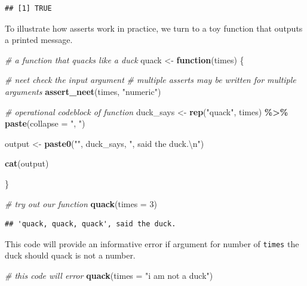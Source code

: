 \documentclass[
]{article}
\newenvironment{Shaded}{\begin{snugshade}}{\end{snugshade}}
\newcommand{\CharTok}[1]{\textcolor[rgb]{0.31,0.60,0.02}{#1}}
\newcommand{\CommentTok}[1]{\textcolor[rgb]{0.56,0.35,0.01}{\textit{#1}}}
\newcommand{\ControlFlowTok}[1]{\textcolor[rgb]{0.13,0.29,0.53}{\textbf{#1}}}
\newcommand{\DataTypeTok}[1]{\textcolor[rgb]{0.13,0.29,0.53}{#1}}
\newcommand{\DecValTok}[1]{\textcolor[rgb]{0.00,0.00,0.81}{#1}}
\newcommand{\KeywordTok}[1]{\textcolor[rgb]{0.13,0.29,0.53}{\textbf{#1}}}
\newcommand{\NormalTok}[1]{#1}
\newcommand{\OperatorTok}[1]{\textcolor[rgb]{0.81,0.36,0.00}{\textbf{#1}}}
\newcommand{\StringTok}[1]{\textcolor[rgb]{0.31,0.60,0.02}{#1}}
\begin{document}
\begin{verbatim}
## [1] TRUE
\end{verbatim}

To illustrate how asserts work in practice, we turn to a toy function that outputs a printed message.

\begin{Shaded}
\begin{Highlighting}[]
\CommentTok{\# a function that quacks like a duck}
\NormalTok{quack <{-}}\StringTok{ }\ControlFlowTok{function}\NormalTok{(times) \{}
  
  \CommentTok{\# neet check the input argument}
  \CommentTok{\# multiple asserts may be written for multiple arguments}
  \KeywordTok{assert\_neet}\NormalTok{(times, }\StringTok{"numeric"}\NormalTok{)}
  
  \CommentTok{\# operational codeblock of function}
\NormalTok{  duck\_says <{-}}\StringTok{ }\KeywordTok{rep}\NormalTok{(}\StringTok{"quack"}\NormalTok{, times) }\OperatorTok{\%>\%}\StringTok{ }
\StringTok{    }\KeywordTok{paste}\NormalTok{(}\DataTypeTok{collapse =} \StringTok{", "}\NormalTok{)}
  
\NormalTok{  output <{-}}\StringTok{ }\KeywordTok{paste0}\NormalTok{(}\StringTok{"\textquotesingle{}"}\NormalTok{, duck\_says, }\StringTok{"\textquotesingle{}, said the duck.}\CharTok{\textbackslash{}n}\StringTok{"}\NormalTok{)}
  
  \KeywordTok{cat}\NormalTok{(output)}
  
\NormalTok{\}}

\CommentTok{\# try out our function}
\KeywordTok{quack}\NormalTok{(}\DataTypeTok{times =} \DecValTok{3}\NormalTok{)}
\end{Highlighting}
\end{Shaded}

\begin{verbatim}
## 'quack, quack, quack', said the duck.
\end{verbatim}

This code will provide an informative error if argument for number of \texttt{times} the duck should quack is not a number.

\begin{Shaded}
\begin{Highlighting}[]
\CommentTok{\# this code will error}
\KeywordTok{quack}\NormalTok{(}\DataTypeTok{times =} \StringTok{"i am not a duck"}\NormalTok{)}
\end{Highlighting}
\end{Shaded}
\end{document}
